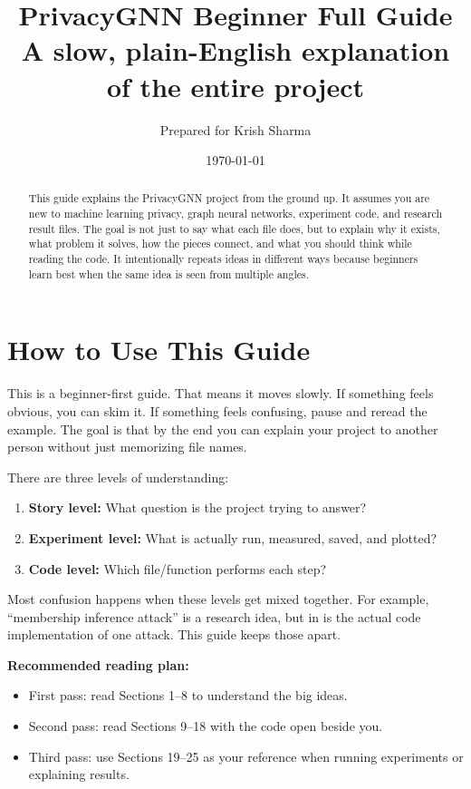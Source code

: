 \documentclass[11pt,a4paper]{article}
\title{\textbf{PrivacyGNN Beginner Full Guide}\\
\large A slow, plain-English explanation of the entire project}
\author{Prepared for Krish Sharma}
\date{\today}
\newcommand{\code}[1]{\texttt{\detokenize{#1}}}
\begin{document}
\maketitle

\begin{abstract}
This guide explains the PrivacyGNN project from the ground up. It assumes you are new to machine learning privacy, graph neural networks, experiment code, and research result files. The goal is not just to say what each file does, but to explain why it exists, what problem it solves, how the pieces connect, and what you should think while reading the code. It intentionally repeats ideas in different ways because beginners learn best when the same idea is seen from multiple angles.
\end{abstract}

\tableofcontents
\newpage

\section{How to Use This Guide}

This is a beginner-first guide. That means it moves slowly. If something feels obvious, you can skim it. If something feels confusing, pause and reread the example. The goal is that by the end you can explain your project to another person without just memorizing file names.

There are three levels of understanding:

\begin{enumerate}
  \item \textbf{Story level:} What question is the project trying to answer?
  \item \textbf{Experiment level:} What is actually run, measured, saved, and plotted?
  \item \textbf{Code level:} Which file/function performs each step?
\end{enumerate}

Most confusion happens when these levels get mixed together. For example, ``membership inference attack'' is a research idea, but \code{confidence_attack} in \code{attacks.py} is the actual code implementation of one attack. This guide keeps those apart.

\textbf{Recommended reading plan:}
\begin{itemize}
  \item First pass: read Sections 1--8 to understand the big ideas.
  \item Second pass: read Sections 9--18 with the code open beside you.
  \item Third pass: use Sections 19--25 as your reference when running experiments or explaining results.
\end{itemize}
\end{document}
